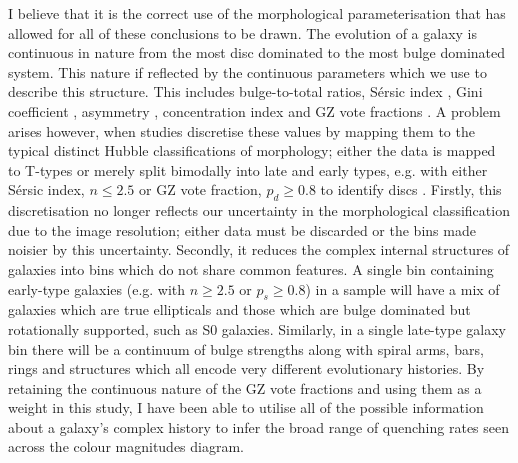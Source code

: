 I believe that it is the correct use of the morphological parameterisation that has allowed for all of these conclusions to be drawn. The evolution of a galaxy is continuous in nature from the most disc dominated to the most bulge dominated system. This nature if reflected by the continuous parameters which we use to describe this structure. This includes bulge-to-total ratios, S\'ersic index \citep{sersic68}, Gini coefficient \citep{abraham03, lotz04}, asymmetry \citep{conselice00}, concentration index \citep{morgan58} and GZ vote fractions \citep{Lintott11}. A problem arises however, when studies discretise these values by mapping them to the typical distinct Hubble classifications of morphology; either the data is mapped to T-types \citep{shimasaku01, brinchmann04, barro15} or merely split bimodally into late and early types, e.g. with either S\'ersic index, $n \leq 2.5$ or GZ vote fraction, $p_d \geq 0.8$ to identify discs \citep{ravindranath04, kelvin12, schawinski14, vika15}. Firstly, this discretisation no longer reflects our uncertainty in the morphological classification due to the image resolution; either data must be discarded or the bins made noisier by this uncertainty. Secondly, it reduces the complex internal structures of galaxies into bins which do not share common features. A single bin containing early-type galaxies (e.g. with $n \geq 2.5$ or $p_s \geq 0.8$) in a sample will have a mix of galaxies which are true ellipticals and those which are bulge dominated but rotationally supported, such as S0 galaxies. Similarly, in a single late-type galaxy bin there will be a continuum of bulge strengths along with spiral arms, bars, rings and structures which all encode very different evolutionary histories. By retaining the continuous nature of the GZ vote fractions and using them as a weight in this study, I have been able to utilise all of the possible information about a galaxy's complex history to infer the broad range of quenching rates seen across the colour magnitudes diagram.

